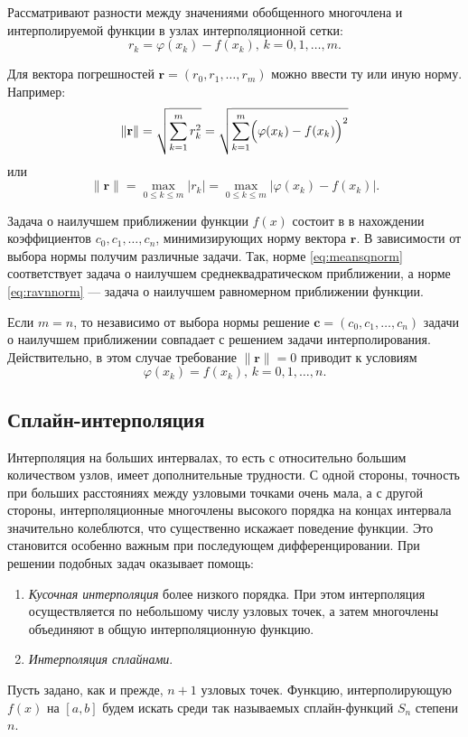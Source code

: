 Рассматривают разности между значениями обобщенного многочлена и
интерполируемой функции в узлах интерполяционной сетки:
\[
r_{k}=\varphi(x_{k})-f(x_{k}),\, k=0,1,\dots,m.
\]

Для вектора погрешностей
$\mathbf{r}=\left(r_{0},r_{1},\dots,r_{m}\right)$ можно ввести ту или
иную норму. Например:
\begin{equation}
\|\mathbf{r}\|=\sqrt{\sum_{k=1}^{m}r_{k}^{2}}=\sqrt{\sum_{k=1}^{m}\Bigl(\varphi(x_{k})-f(x_{k})\Bigr)^{2}}\label{eq:meansqnorm}
\end{equation}
или
\begin{equation}
\|\mathbf{r}\|=\max_{0\leqslant k\leqslant m}|r_{k}|=\max_{0\leqslant k\leqslant m}|\varphi(x_{k})-f(x_{k})|.\label{eq:ravnnorm}
\end{equation}


Задача о наилучшем приближении функции $f(x)$ состоит в в нахождении
коэффициентов $c_{0},c_{1},\dots,c_{n}$, минимизирующих норму вектора
$\mathbf{r}$. В зависимости от выбора нормы получим различные задачи.
Так, норме \eqref{eq:meansqnorm} соответствует задача о наилучшем
среднеквадратическом приближении, а норме \eqref{eq:ravnnorm} ---
задача о наилучшем равномерном приближении функции.

Если $m=n$, то независимо от выбора нормы решение
$\mathbf{c}=(c_{0},c_{1},\dots,c_{n})$ задачи о наилучшем приближении
совпадает с решением задачи интерполирования.  Действительно, в этом
случае требование $\|\mathbf{r}\|=0$ приводит к условиям
\[
\varphi(x_{k})=f(x_{k}),\, k=0,1,\dots,n.
\]

\subsection{Сплайн-интерполяция}

Интерполяция на больших интервалах, то есть с относительно большим
количеством узлов, имеет дополнительные трудности. С одной стороны,
точность при больших расстояниях между узловыми точками очень мала, а
с другой стороны, интерполяционные многочлены высокого порядка на
концах интервала значительно колеблются, что существенно искажает
поведение функции. Это становится особенно важным при последующем
дифференцировании. При решении подобных задач оказывает помощь:

\begin{enumerate}
\item \emph{Кусочная интерполяция} более
  низкого порядка. При этом интерполяция осуществляется по небольшому
  числу узловых точек, а затем многочлены объединяют в общую
  интерполяционную функцию.
\item \emph{Интерполяция сплайнами}.
\end{enumerate}
Пусть задано, как и прежде, $n+1$ узловых точек. Функцию,
интерполирующую $f(x)$ на $[a,b]$ будем искать среди так называемых
сплайн-функций $S_{n}$ степени $n$.

